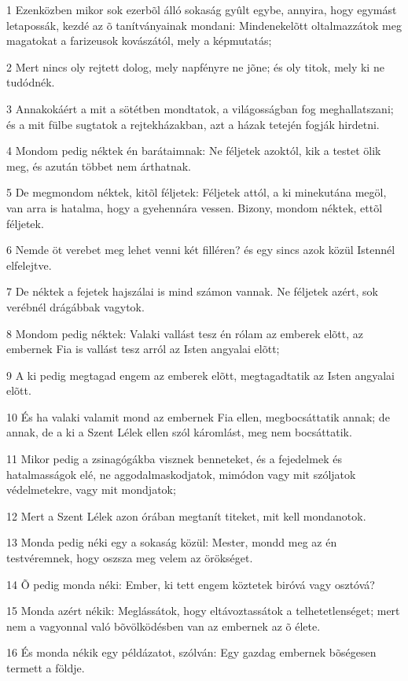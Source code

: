 \par 1 Ezenközben mikor sok ezerbõl álló sokaság gyûlt egybe, annyira, hogy egymást letapossák, kezdé az õ tanítványainak mondani: Mindenekelõtt oltalmazzátok meg magatokat a farizeusok kovászától, mely a  képmutatás;
\par 2 Mert nincs oly rejtett dolog, mely napfényre ne jõne; és oly titok, mely ki ne tudódnék.
\par 3 Annakokáért a mit a sötétben mondtatok, a világosságban fog meghallatszani; és a mit fülbe sugtatok a rejtekházakban, azt a házak tetején fogják hirdetni.
\par 4 Mondom pedig néktek én barátaimnak: Ne féljetek azoktól, kik a testet ölik meg, és azután  többet nem árthatnak.
\par 5 De megmondom néktek, kitõl féljetek: Féljetek attól, a ki minekutána megöl, van arra is hatalma, hogy a gyehennára vessen. Bizony, mondom néktek, ettõl féljetek.
\par 6 Nemde öt verebet meg lehet venni két filléren? és egy sincs azok közül Istennél elfelejtve.
\par 7 De néktek a fejetek hajszálai is mind számon vannak. Ne féljetek azért, sok verébnél drágábbak vagytok.
\par 8 Mondom pedig néktek: Valaki vallást tesz én rólam az emberek elõtt, az embernek Fia is vallást tesz arról az Isten angyalai elõtt;
\par 9 A ki pedig megtagad engem az emberek elõtt, megtagadtatik az Isten angyalai elõtt.
\par 10 És ha valaki valamit mond az embernek Fia ellen, megbocsáttatik annak; de annak, de a ki a Szent Lélek ellen szól káromlást, meg nem bocsáttatik.
\par 11 Mikor pedig a zsinagógákba visznek benneteket, és a fejedelmek és hatalmasságok elé, ne aggodalmaskodjatok, mimódon vagy mit szóljatok védelmetekre, vagy mit mondjatok;
\par 12 Mert a Szent Lélek azon órában megtanít titeket, mit kell mondanotok.
\par 13 Monda pedig néki egy a sokaság közül: Mester, mondd meg az én testvéremnek, hogy oszsza meg velem az örökséget.
\par 14 Õ pedig monda néki: Ember, ki tett engem köztetek biróvá vagy osztóvá?
\par 15 Monda azért nékik: Meglássátok, hogy eltávoztassátok a telhetetlenséget; mert nem a vagyonnal való bõvölködésben van az embernek az õ élete.
\par 16 És monda nékik egy példázatot, szólván: Egy gazdag embernek bõségesen termett a földje.
